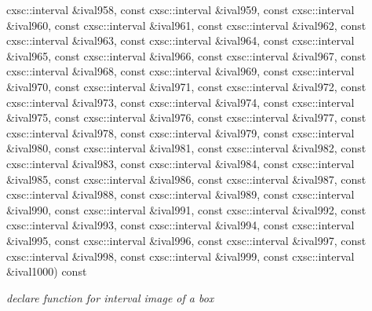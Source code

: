 \begin{DoxyCompactItemize}
cxsc\-::interval \&ival958, const cxsc\-::interval \&ival959, const cxsc\-::interval \&ival960, const cxsc\-::interval \&ival961, const cxsc\-::interval \&ival962, const cxsc\-::interval \&ival963, const cxsc\-::interval \&ival964, const cxsc\-::interval \&ival965, const cxsc\-::interval \&ival966, const cxsc\-::interval \&ival967, const cxsc\-::interval \&ival968, const cxsc\-::interval \&ival969, const cxsc\-::interval \&ival970, const cxsc\-::interval \&ival971, const cxsc\-::interval \&ival972, const cxsc\-::interval \&ival973, const cxsc\-::interval \&ival974, const cxsc\-::interval \&ival975, const cxsc\-::interval \&ival976, const cxsc\-::interval \&ival977, const cxsc\-::interval \&ival978, const cxsc\-::interval \&ival979, const cxsc\-::interval \&ival980, const cxsc\-::interval \&ival981, const cxsc\-::interval \&ival982, const cxsc\-::interval \&ival983, const cxsc\-::interval \&ival984, const cxsc\-::interval \&ival985, const cxsc\-::interval \&ival986, const cxsc\-::interval \&ival987, const cxsc\-::interval \&ival988, const cxsc\-::interval \&ival989, const cxsc\-::interval \&ival990, const cxsc\-::interval \&ival991, const cxsc\-::interval \&ival992, const cxsc\-::interval \&ival993, const cxsc\-::interval \&ival994, const cxsc\-::interval \&ival995, const cxsc\-::interval \&ival996, const cxsc\-::interval \&ival997, const cxsc\-::interval \&ival998, const cxsc\-::interval \&ival999, const cxsc\-::interval \&ival1000) const 
\begin{DoxyCompactList}\small\item\em declare function for interval image of a box \end{DoxyCompactList}\item 

\end{DoxyCompactItemize}
